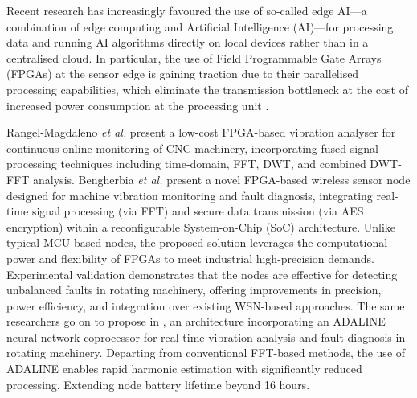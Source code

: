 \documentclass[../main.tex]{subfiles}
\begin{document}

Recent research has increasingly favoured the use of so-called edge AI---a combination of edge computing and Artificial Intelligence (AI)---for processing data and running AI algorithms directly on local devices rather than in a centralised cloud. In particular, the use of Field Programmable Gate Arrays (FPGAs) at the sensor edge is gaining traction due to their parallelised processing capabilities, which eliminate the transmission bottleneck at the cost of increased power consumption at the processing unit \cite{RN37}.

Rangel-Magdaleno \textit{et al.} \cite{RN11} present a low-cost FPGA-based vibration analyser for continuous online monitoring of CNC machinery, incorporating fused signal processing techniques including time-domain, FFT, DWT, and combined DWT-FFT analysis. Bengherbia \textit{et al.} \cite{RN2} present a novel FPGA-based wireless sensor node designed for machine vibration monitoring and fault diagnosis, integrating real-time signal processing (via FFT) and secure data transmission (via AES encryption) within a reconfigurable System-on-Chip (SoC) architecture. Unlike typical MCU-based nodes, the proposed solution leverages the computational power and flexibility of FPGAs to meet industrial high-precision demands. Experimental validation demonstrates that the nodes are effective for detecting unbalanced faults in rotating machinery, offering improvements in precision, power efficiency, and integration over existing WSN-based approaches. The same researchers go on to propose in \cite{RN1}, an architecture incorporating an ADALINE neural network coprocessor for real-time vibration analysis and fault diagnosis in rotating machinery. Departing from conventional FFT-based methods, the use of ADALINE enables rapid harmonic estimation with significantly reduced processing. Extending node battery lifetime beyond 16 hours.


\onecolumn

\biblio
\end{document}
